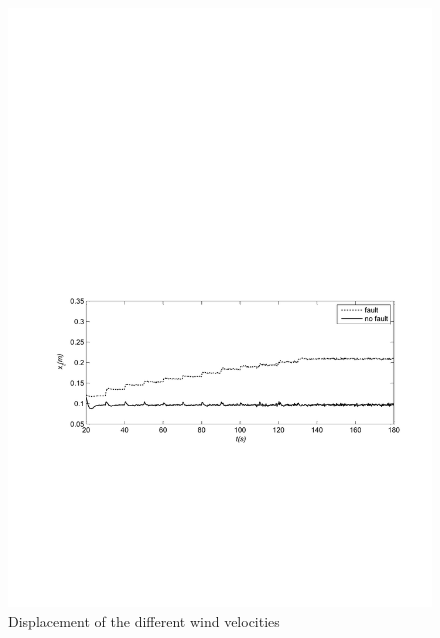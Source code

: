 \begin{figure}[!htb]
  \centering
  \includegraphics[width=\hsize]{MATLAB-fault5.pdf}
  \caption{Displacement of the different wind velocities}
  \label{fig:fault5}
\end{figure}

